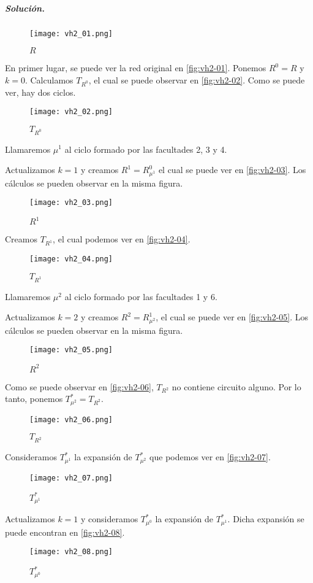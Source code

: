 \documentclass[12pt, oneside, a4paper]{article}
\begin{document}
\subparagraph{Solución.\\}

\begin{figure}
\centering
\texttt{[image: vh2\_01.png]}
\caption{$R$}
\label{fig:vh2-01}
\end{figure}
En primer lugar, se puede ver la red original en \autoref{fig:vh2-01}.
Ponemos $R^0=R$ y $k=0$. Calculamos $T_{R^0}$, el cual se puede
observar en \autoref{fig:vh2-02}. Como se puede ver, hay dos
ciclos.

\begin{figure}
\centering
\texttt{[image: vh2\_02.png]}
\caption{$T_{R^{0}}$}
\label{fig:vh2-02}
\end{figure}

Llamaremos $\mu^1$ al ciclo formado por las facultades 2, 3 y
4.

Actualizamos $k=1$ y creamos $R^1=R^0_{\mu^1}$ el cual se puede ver
en \autoref{fig:vh2-03}. Los cálculos se pueden observar en la misma
figura.

\begin{figure}
\centering
\texttt{[image: vh2\_03.png]}
\caption{$R^{1}$}
\label{fig:vh2-03}
\end{figure}

Creamos $T_{R^{1}}$, el cual podemos ver en \autoref{fig:vh2-04}.

\begin{figure}
\centering
\texttt{[image: vh2\_04.png]}
\caption{$T_{R^{1}}$}
\label{fig:vh2-04}
\end{figure}

Llamaremos $\mu^2$ al ciclo formado por las facultades 1 y 6.

Actualizamos $k=2$ y creamos $R^2=R^1_{\mu^2}$, el cual se puede ver
en \autoref{fig:vh2-05}. Los cálculos se pueden observar en la misma figura.

\begin{figure}
\centering
\texttt{[image: vh2\_05.png]}
\caption{$R^2$}
\label{fig:vh2-05}
\end{figure}

Como se puede observar en \autoref{fig:vh2-06}, $T_{R^{2}}$ no contiene
circuito alguno. Por lo tanto, ponemos $T^{*}_{\mu^{2}}=T_{R^{2}}$.

\begin{figure}
\centering
\texttt{[image: vh2\_06.png]}
\caption{$T_{R^2}$}
\label{fig:vh2-06}
\end{figure}

Consideramos $T^{*}_{\mu^{1}}$ la expansión de $T^{*}_{\mu^{2}}$ que
podemos ver en \autoref{fig:vh2-07}.

\begin{figure}
\centering
\texttt{[image: vh2\_07.png]}
\caption{$T^{*}_{\mu^1}$}
\label{fig:vh2-07}
\end{figure}

Actualizamos $k=1$ y consideramos $T^{*}_{\mu^{0}}$ la expansión de
$T^{*}_{\mu^{1}}$. Dicha expansión se puede encontran en
\autoref{fig:vh2-08}.

\begin{figure}
\centering
\texttt{[image: vh2\_08.png]}
\caption{$T^{*}_{\mu^0}$}
\label{fig:vh2-08}
\end{figure}
\end{document}
